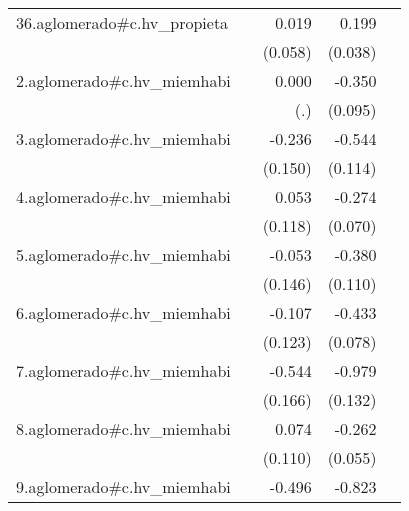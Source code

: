 {\begin{longtable}{l*{4}{D{.}{.}{-1}}}
\addlinespace
36.aglomerado#c.hv\_propieta&                     &       0.019         &       0.199\sym{***}&                     \\
            &                     &     (0.058)         &     (0.038)         &                     \\
\addlinespace
2.aglomerado#c.hv\_miemhabi&                     &       0.000         &      -0.350\sym{***}&                     \\
            &                     &         (.)         &     (0.095)         &                     \\
\addlinespace
3.aglomerado#c.hv\_miemhabi&                     &      -0.236         &      -0.544\sym{***}&                     \\
            &                     &     (0.150)         &     (0.114)         &                     \\
\addlinespace
4.aglomerado#c.hv\_miemhabi&                     &       0.053         &      -0.274\sym{***}&                     \\
            &                     &     (0.118)         &     (0.070)         &                     \\
\addlinespace
5.aglomerado#c.hv\_miemhabi&                     &      -0.053         &      -0.380\sym{***}&                     \\
            &                     &     (0.146)         &     (0.110)         &                     \\
\addlinespace
6.aglomerado#c.hv\_miemhabi&                     &      -0.107         &      -0.433\sym{***}&                     \\
            &                     &     (0.123)         &     (0.078)         &                     \\
\addlinespace
7.aglomerado#c.hv\_miemhabi&                     &      -0.544\sym{**} &      -0.979\sym{***}&                     \\
            &                     &     (0.166)         &     (0.132)         &                     \\
\addlinespace
8.aglomerado#c.hv\_miemhabi&                     &       0.074         &      -0.262\sym{***}&                     \\
            &                     &     (0.110)         &     (0.055)         &                     \\
\addlinespace
9.aglomerado#c.hv\_miemhabi&                     &      -0.496\sym{***}&      -0.823\sym{***}&                     \\

\end{longtable}}
